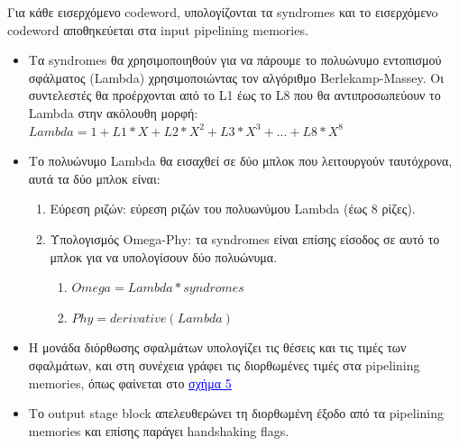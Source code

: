 \documentclass[12pt,a4paper]{article}
\begin{document}
    Για κάθε εισερχόμενο codeword, υπολογίζονται τα syndromes και το εισερχόμενo codeword αποθηκεύεται στα input pipelining memories.
    \begin{itemize}
        \item Τα syndromes θα χρησιμοποιηθούν για να πάρουμε το πολυώνυμο εντοπισμού σφάλματος (Lambda) χρησιμοποιώντας τον αλγόριθμο Berlekamp-Massey. Οι συντελεστές θα προέρχονται από το L1 έως το L8 που θα αντιπροσωπεύουν το Lambda στην ακόλουθη μορφή:
        $Lambda = 1 + L1 * X + L2 * X^2 + L3 * X^3 + ... + L8 * X^8$

        \item Το πολυώνυμο Lambda θα εισαχθεί σε δύο μπλοκ που λειτουργούν ταυτόχρονα, αυτά τα δύο μπλοκ είναι:
                \begin{enumerate}
                
                    \item[\ding{118}] Εύρεση ριζών: εύρεση ριζών του πολυωνύμου Lambda (έως 8 ρίζες).  
                    \item[\ding{118}] Υπολογισμός Omega-Phy: τα syndromes είναι επίσης είσοδος σε αυτό το μπλοκ για να υπολογίσουν δύο πολυώνυμα.
                \begin{enumerate}
                  \item[\ding{51}] $Omega = Lambda * syndromes$
                  \item[\ding{51}] $Phy = derivative(Lambda)$
                \end{enumerate}
                \end{enumerate}
              
        \item  Η μονάδα διόρθωσης σφαλμάτων υπολογίζει τις θέσεις και τις τιμές των σφαλμάτων, και στη συνέχεια γράφει τις διορθωμένες τιμές στα pipelining memories, όπως φαίνεται στο \hyperref[Block diagram of Reed Solomon Decoder]{\textcolor{blue}{\underline{σχήμα 5}}}

        \item  Το output stage block απελευθερώνει τη διορθωμένη έξοδο από τα pipelining memories και επίσης παράγει handshaking flags.
    \end{itemize}
    
\end{document}
